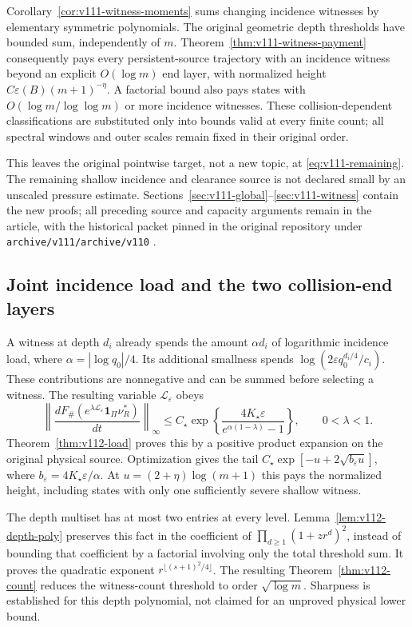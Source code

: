 \documentclass[11pt,reqno]{amsart}
\numberwithin{equation}{section}
\theoremstyle{definition}\newtheorem{definition}[theorem]{Definition}
\theoremstyle{remark}\newtheorem{remark}[theorem]{Remark}
\newcommand{\one}{\mathbf1}\newcommand{\dd}{\,\mathrm d}
\begin{document}
Corollary~\ref{cor:v111-witness-moments} sums changing incidence
witnesses by elementary symmetric polynomials. The original geometric
depth thresholds have bounded sum, independently of $m$.
Theorem~\ref{thm:v111-witness-payment} consequently pays every
persistent-source trajectory with an incidence witness beyond an
explicit $O(\log m)$ end layer, with normalized height
$C\varepsilon(B)(m+1)^{-\eta}$. A factorial bound also pays states
with $O(\log m/\log\log m)$ or more incidence witnesses. These
collision-dependent classifications are substituted only into bounds
valid at every finite count; all spectral windows and outer scales
remain fixed in their original order.

This leaves the original pointwise target, not a new topic, at
\eqref{eq:v111-remaining}. The remaining shallow incidence and
clearance source is not declared small by an unscaled pressure
estimate. Sections~\ref{sec:v111-global}--\ref{sec:v111-witness}
contain the new proofs; all preceding source and capacity arguments
remain in the article, with the historical packet pinned in the original repository
under \texttt{archive/v111/archive/v110} \cite{Q110}.


\subsection*{Joint incidence load and the two collision-end layers}
A witness at depth $d_i$ already spends the amount
$\alpha d_i$ of logarithmic incidence load, where
$\alpha=|\log q_0|/4$. Its additional smallness spends
$\log(2\varepsilon q_0^{d_i/4}/c_i)$. These contributions are
nonnegative and can be summed before selecting a witness. The
resulting variable $\mathscr L_\varepsilon$ obeys
\[
 \left\|\frac{dF_\#(e^{\lambda\mathscr L_\varepsilon}
                               \one_\Pi\nu_R^*)}{dt}\right\|_\infty
 \le C_\star\exp\left\{\frac{4K_\star\varepsilon}
                                  {e^{\alpha(1-\lambda)}-1}\right\},
 \qquad 0<\lambda<1.
\]
Theorem~\ref{thm:v112-load} proves this by a positive product
expansion on the original physical source. Optimization gives the
tail $C_\star\exp[-u+2\sqrt{b_\varepsilon u}]$, where
$b_\varepsilon=4K_\star\varepsilon/\alpha$.
At $u=(2+\eta)\log(m+1)$ this pays the normalized height, including
states with only one sufficiently severe shallow witness.

The depth multiset has at most two entries at every level.
Lemma~\ref{lem:v112-depth-poly} preserves this fact in the
coefficient of $\prod_{d\ge1}(1+zr^d)^2$, instead of bounding that
coefficient by a factorial involving only the total threshold sum.
It proves the quadratic exponent
$r^{\lfloor(s+1)^2/4\rfloor}$. The resulting
Theorem~\ref{thm:v112-count} reduces the witness-count threshold to
order $\sqrt{\log m}$. Sharpness is established for this depth
polynomial, not claimed for an unproved physical lower bound.
\end{document}
